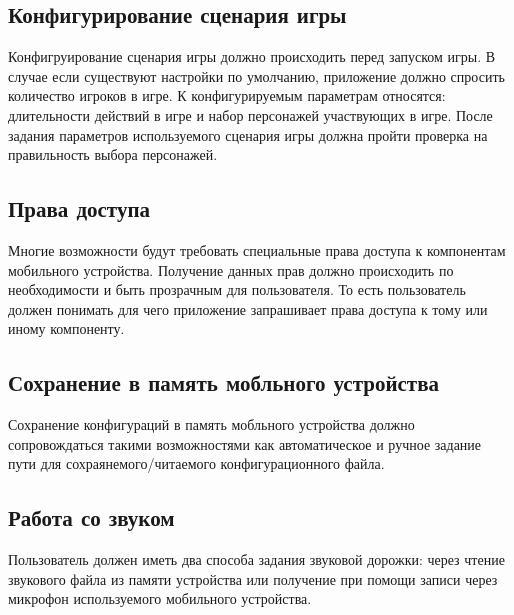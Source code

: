 \subsection{Конфигурирование сценария игры}

Конфигруирование сценария игры должно происходить перед запуском игры. В случае если существуют настройки по умолчанию, приложение должно спросить количество игроков в игре. К конфигурируемым параметрам относятся: длительности действий в игре и набор персонажей участвующих в игре. После задания параметров используемого сценария игры должна пройти проверка на правильность выбора персонажей.

\subsection{Права доступа}

Многие возможности будут требовать специальные права доступа к компонентам мобильного устройства. Получение данных прав должно происходить по необходимости и быть прозрачным для пользователя. То есть пользователь должен понимать для чего приложение запрашивает права доступа к тому или иному компоненту.

\subsection{Сохранение в память мобльного устройства}

Сохранение конфигураций в память мобльного устройства должно сопровождаться такими возможностями как автоматическое и ручное задание пути для сохраянемого/читаемого конфигурационного файла.

\subsection{Работа со звуком}

Пользователь должен иметь два способа задания звуковой дорожки: через чтение звукового файла из памяти устройства или получение при помощи записи через микрофон используемого мобильного устройства.
